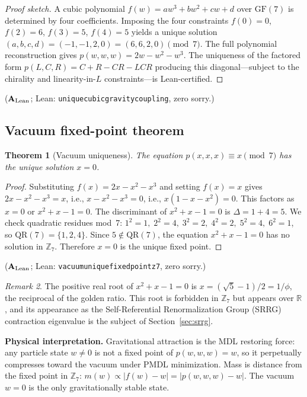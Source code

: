 \documentclass[11pt]{article}
\newtheorem{theorem}{Theorem}[section]
\theoremstyle{remark}
\newtheorem{remark}[theorem]{Remark}
\newcommand{\ZS}{\mathbb{Z}_7}
\newcommand{\lean}[1]{%
  \penalty-100
  \begingroup\def\_{\textunderscore\allowbreak}\texttt{#1}\endgroup}
\newcommand{\GFseven}{\mathrm{GF}(7)}
\newcommand{\CatAL}{\ensuremath{\textbf{A}_{\rm Lean}}}
\begin{document}
\begin{proof}[Proof sketch]
A cubic polynomial $f(w) = aw^3 + bw^2 + cw + d$ over $\GFseven$ is determined
by four coefficients. Imposing the four constraints $f(0)=0$, $f(2)=6$, $f(3)=5$,
$f(4)=5$ yields a unique solution $(a,b,c,d) = (-1,-1,2,0) = (6,6,2,0)\pmod 7$.
The full polynomial reconstruction gives $p(w,w,w) = 2w - w^2 - w^3$.
The uniqueness of the factored form $p(L,C,R) = C+R-CR-LCR$ producing this
diagonal---subject to the chirality and linearity-in-$L$ constraints---is
Lean-certified.
\end{proof}

\noindent
($\CatAL$; Lean: \lean{unique\_cubic\_gravity\_coupling}, zero sorry.)



\subsection{Vacuum fixed-point theorem}
\label{ssec:vacuum_fp}

\begin{theorem}[Vacuum uniqueness]
\label{thm:vacuum}
The equation $p(x,x,x) \equiv x \pmod{7}$ has the unique solution $x = 0$.
\end{theorem}

\begin{proof}
Substituting $f(x) = 2x - x^2 - x^3$ and setting $f(x) = x$ gives
$2x - x^2 - x^3 = x$, i.e., $x - x^2 - x^3 = 0$, i.e., $x(1 - x - x^2) = 0$.
This factors as $x = 0$ or $x^2 + x - 1 = 0$. The discriminant of $x^2 + x - 1 = 0$
is $\Delta = 1 + 4 = 5$. We check quadratic residues mod~7:
$1^2=1,\;2^2=4,\;3^2=2,\;4^2=2,\;5^2=4,\;6^2=1$, so $\mathrm{QR}(7) = \{1,2,4\}$.
Since $5 \notin \mathrm{QR}(7)$, the equation $x^2+x-1=0$ has no solution in $\ZS$.
Therefore $x=0$ is the unique fixed point.
\end{proof}

\noindent
($\CatAL$; Lean: \lean{vacuum\_unique\_fixed\_point\_z7}, zero sorry.)

\begin{remark}
The positive real root of $x^2+x-1=0$ is $x = (\sqrt{5}-1)/2 = 1/\phi$, the
reciprocal of the golden ratio. This root is forbidden in $\ZS$ but appears over
$\mathbb{R}$, and its appearance as the Self-Referential Renormalization Group (SRRG) contraction
eigenvalue is the subject of Section~\ref{sec:srrg}.
\end{remark}

\medskip
\noindent\textbf{Physical interpretation.}
Gravitational attraction is the MDL restoring force: any particle state $w \neq 0$
is not a fixed point of $p(w,w,w)=w$, so it perpetually compresses toward the
vacuum under PMDL minimization. Mass is distance from the fixed point in $\ZS$:
$m(w) \propto |f(w) - w| = |p(w,w,w) - w|$. The vacuum $w=0$ is the only
gravitationally stable state.
\end{document}
